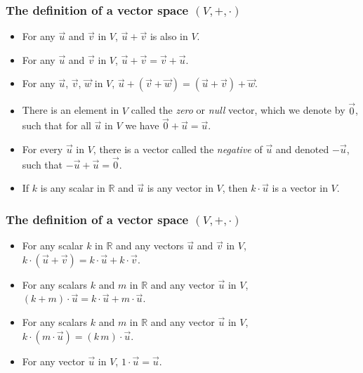\begin{frame}[fragile]
\frametitle{The definition of a vector space $(V, +, \cdot)$}
\begin{itemize}
\item For any $\vec{u}$ and $\vec{v}$ in $V$, $\vec{u} + \vec{v}$ is also in $V$.
\item For any $\vec{u}$ and $\vec{v}$ in $V$, $\vec{u} + \vec{v} = \vec{v} + \vec{u}$.
\item For any $\vec{u}$, $\vec{v}$, $\vec{w}$ in $V$, $\vec{u} + (\vec{v} + \vec{w}) = (\vec{u} + \vec{v}) + \vec{w}$.
\item There is an element in $V$ called the {\em zero} or {\em null} vector, 
which we denote by $\vec{0}$, such that for all $\vec{u}$ in $V$ we have $\vec{0} + \vec{u} = \vec{u}$. 
\item For every $\vec{u}$ in $V$, there is a vector called the {\em negative} of $\vec{u}$ and denoted $ - \vec{u}$, such that $ - \vec{u} + \vec{u} = \vec{0}$.
\item If $k$ is any scalar in $\mathbb{R}$ and $\vec{u}$ is any vector in $V$, then $k \cdot \vec{u}$ is a vector in $V$.
\end{itemize}
\end{frame}

\begin{frame}[fragile]
\frametitle{The definition of a vector space $(V, +, \cdot)$}
\begin{itemize}
\item For any scalar $k$ in $\mathbb{R}$ and any vectors $\vec{u}$ and $ \vec{v}$ in $V$, $k \cdot (\vec{u} + \vec{v}) = k \cdot \vec{u} + k \cdot \vec{v}$.
\item For any scalars $k$ and $m$ in $\mathbb{R}$ and any vector $\vec{u}$ in $V$, $(k + m) \cdot \vec{u} = k \cdot \vec{u} + m \cdot \vec{u}$.
\item For any scalars $k$ and $m$ in $\mathbb{R}$ and any vector $\vec{u}$ in $V$, $k \cdot (m \cdot \vec{u}) = (k \, m) \cdot \vec{u}$.
\item For any vector $\vec{u}$ in $V$, $1 \cdot \vec{u} = \vec{u}$.
\end{itemize}
\end{frame}

